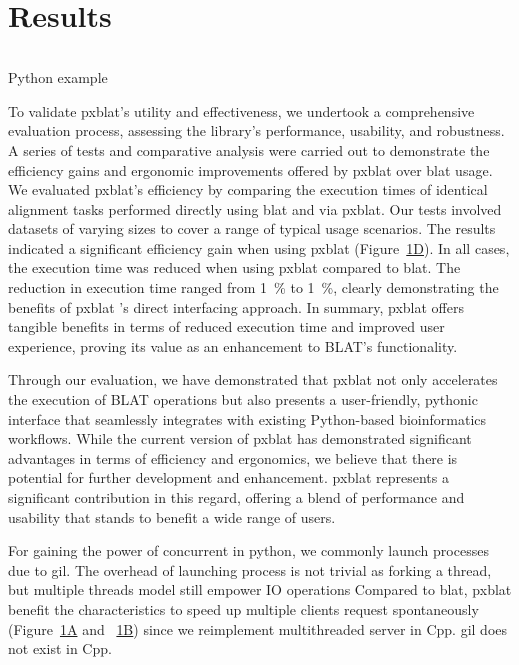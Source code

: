 \section*{Results}\label{sec:results}

\begin{listing}
	\inputminted[linenos]{python}{codes/example1.py}
	\caption{Python example}
	\label{listing:1}
\end{listing}


To validate \gls{pxblat}'s utility and effectiveness, we undertook a comprehensive evaluation process, assessing the library's performance, usability, and robustness.
A series of tests and comparative analysis were carried out to demonstrate the efficiency gains and ergonomic improvements offered by \gls{pxblat} over \gls{blat} usage.
We evaluated \gls{pxblat}'s efficiency by comparing the execution times of identical alignment tasks performed directly using \gls{blat}  and via \gls{pxblat}.
Our tests involved datasets of varying sizes to cover a range of typical usage scenarios.
The results indicated a significant efficiency gain when using \gls{pxblat} (Figure~\hyperref[fig:pxblat]{1D}).
In all cases, the execution time was reduced when using \gls{pxblat} compared to \gls{blat}.
The reduction in execution time ranged from \SI{1}{\percent} to \SI{1}{\percent}, clearly demonstrating the benefits of \gls{pxblat} 's direct interfacing approach.
In summary, \gls{pxblat}  offers tangible benefits in terms of reduced execution time and improved user experience, proving its value as an enhancement to BLAT's functionality.

Through our evaluation, we have demonstrated that \gls{pxblat} not only accelerates the execution of BLAT operations but also presents a user-friendly,
pythonic interface that seamlessly integrates with existing Python-based bioinformatics workflows.
While the current version of \gls{pxblat}  has demonstrated significant advantages in terms of efficiency and ergonomics, we believe that there is potential for further development and enhancement.
\gls{pxblat} represents a significant contribution in this regard, offering a blend of performance and usability that stands to benefit a wide range of users.

For gaining the power of concurrent in python, we commonly launch processes due to \gls{gil}.
The overhead of launching process is not trivial as forking a thread, but multiple threads model still empower IO operations
Compared to \gls{blat}, \gls{pxblat} benefit the characteristics to speed up multiple clients request spontaneously (Figure~\hyperref[fig:pxblat]{1A} and ~\hyperref[fig:pxblat]{1B}) since we reimplement multithreaded server in Cpp.
\gls{gil} does not exist in Cpp.



